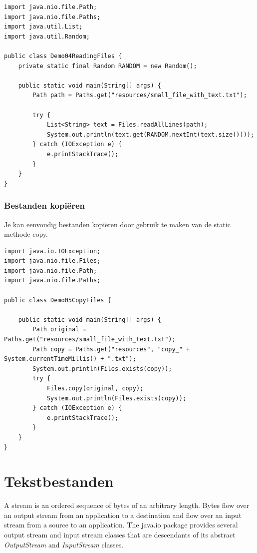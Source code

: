 \begin{lstlisting}
import java.nio.file.Path;
import java.nio.file.Paths;
import java.util.List;
import java.util.Random;

public class Demo04ReadingFiles {
	private static final Random RANDOM = new Random();

	public static void main(String[] args) {
		Path path = Paths.get("resources/small_file_with_text.txt");

		try {
			List<String> text = Files.readAllLines(path);
			System.out.println(text.get(RANDOM.nextInt(text.size())));
		} catch (IOException e) {
			e.printStackTrace();
		}
	}
}
\end{lstlisting}

\subsubsection{Bestanden kopi\"eren}

Je kan eenvoudig bestanden kopi\"eren door gebruik te maken van de static methode copy.

\begin{lstlisting}
import java.io.IOException;
import java.nio.file.Files;
import java.nio.file.Path;
import java.nio.file.Paths;

public class Demo05CopyFiles {

	public static void main(String[] args) {
		Path original = Paths.get("resources/small_file_with_text.txt");
		Path copy = Paths.get("resources", "copy_" + System.currentTimeMillis() + ".txt");
		System.out.println(Files.exists(copy));
		try {
			Files.copy(original, copy);
			System.out.println(Files.exists(copy));
		} catch (IOException e) {
			e.printStackTrace();
		}
	}
}
\end{lstlisting}

\section{Tekstbestanden}


A stream is an ordered sequence of bytes of an arbitrary length. Bytes flow over an output stream from an application to a destination and flow over an input stream from a source to an application.
The java.io package provides several output stream and input stream classes that are descendants of its abstract \textit{OutputStream} and \textit{InputStream} classes.



